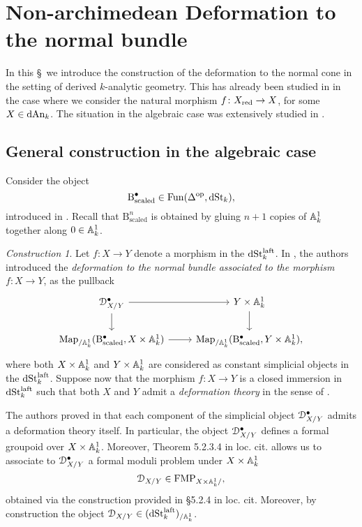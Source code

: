 \documentclass[10pt,a4paper,reqno]{amsart} %
\theoremstyle{plain}
\theoremstyle{definition}
\theoremstyle{remark}
\numberwithin{equation}{section}
\newtheorem{construction}[thm]{Construction}
\begin{document}
\section{Non-archimedean Deformation to the normal bundle}

In this \S \ we introduce the construction of the deformation to the normal cone in the setting of derived $k$-analytic geometry. This has
already been studied in \cite{Porta_Yu_NQK} in the case where we consider the natural morphism $f \colon X_{\mathrm{red}} \to X$, for some $X \in \mathrm{dAn}_k$.
The situation in the algebraic case was extensively studied in \cite{Gaitsgory_Study_II}.

\subsection{General construction in the algebraic case} Consider the object
    \[
        \mathrm{B}^\bullet_{\mathrm{scaled}} \in \operatorname{Fun}(\Delta ^\mathrm{op}, \mathrm{dSt}_k),
    \]
introduced in
\cite[\S 9.2.2]{Gaitsgory_Study_II}. Recall that $\mathrm{B}^{n}_\mathrm{scaled}$ is obtained by gluing $n+1$ copies of $\mathbb A^1_k$ together along
$0 \in \mathbb A^1_k$.

\begin{construction} \label{construction:def_to_the_normal_bundle}
    Let $f \colon X \to Y$ denote a morphism in the \infcat $\mathrm{dSt}_k^{\mathrm{laft}}$.
    In \cite[\S 9.3]{Gaitsgory_Study_II}, the authors introduced the \emph{deformation to the normal bundle associated to the morphism $f \colon X \to Y$}, as the pullback
        \[
        \begin{tikzcd}
            \cD^\bullet_{X/Y} \ar{r} \ar{d} &   Y \times \bbA^1_k \ar{d} \\
            \Map_{/ \bbA^1_k}(\mathrm{B}^\bullet_{\mathrm{scaled}}, X \times \bbA^1_k) \ar{r} & \Map_{/ \bbA^1_k}(\mathrm{B}^\bullet_{\mathrm{scaled}}, Y \times \bbA^1_k),
        \end{tikzcd}
        \]
    where both $X \times \mathbb A^1_k$ and $Y \times \mathbb A^1_k$ are considered as constant simplicial objects in the \infcat $\mathrm{dSt}^{\mathrm{laft}}_k$. Suppose now that
    the morphism $f \colon X \to Y$ is a closed immersion in $\mathrm{dSt}^{\mathrm{laft}}_k$ such that both $X$ and $Y$ admit a \emph{deformation theory} in the sense of
    \cite[\S 1]{Gaitsgory_Study_II}.
    
    The authors proved in \cite[Theorem 9.2.3.4]{Gaitsgory_Study_II} that each component of the simplicial object
    $\mathcal D_{X/Y}^\bullet$ admits a deformation theory itself. In particular, the object $\mathcal D^\bullet_{X/ Y}$ defines a formal groupoid over
    $X \times \mathbb A^1_k$. Moreover, Theorem 5.2.3.4 in loc. cit. allows us to associate to $\mathcal D^\bullet_{X/Y}$ a
    formal moduli problem under $X \times \mathbb A^1_k$
           \[
               \mathcal D_{X/Y} \in \mathrm{FMP}_{X \times \mathbb A^1_k/ },
           \]
    obtained via the construction provided in \S 5.2.4 in loc. cit. Moreover, by construction the object $\mathcal D_{X/Y} \in (\mathrm{dSt}^{\mathrm{laft}}_k)_{/\mathbb A^1_k}$.
\end{construction}
\end{document}
